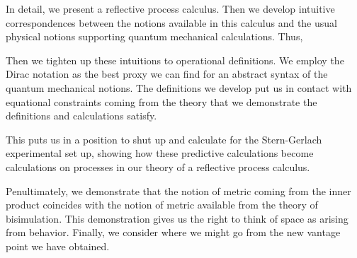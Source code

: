 In detail, we present a reflective process calculus. Then we develop
intuitive correspondences between the notions available in this
calculus and the usual physical notions supporting quantum mechanical
calculations. Thus, 

\begin{table}[htp]
  \caption{QM - process calculi correspondences}
\end{table}

Then we tighten up these intuitions to operational definitions. We
employ the Dirac notation as the best proxy we can find for an
abstract syntax of the quantum mechanical notions. The definitions we
develop put us in contact with equational constraints coming from the
theory that we demonstrate the definitions and calculations satisfy.

This puts us in a position to shut up and calculate for the
Stern-Gerlach experimental set up, showing how these predictive
calculations become calculations on processes in our theory of a
reflective process calculus.

Penultimately, we demonstrate that the notion of metric coming from
the inner product coincides with the notion of metric available from
the theory of bisimulation. This demonstration gives us the right to
think of space as arising from behavior. Finally, we consider where we
might go from the new vantage point we have obtained.

